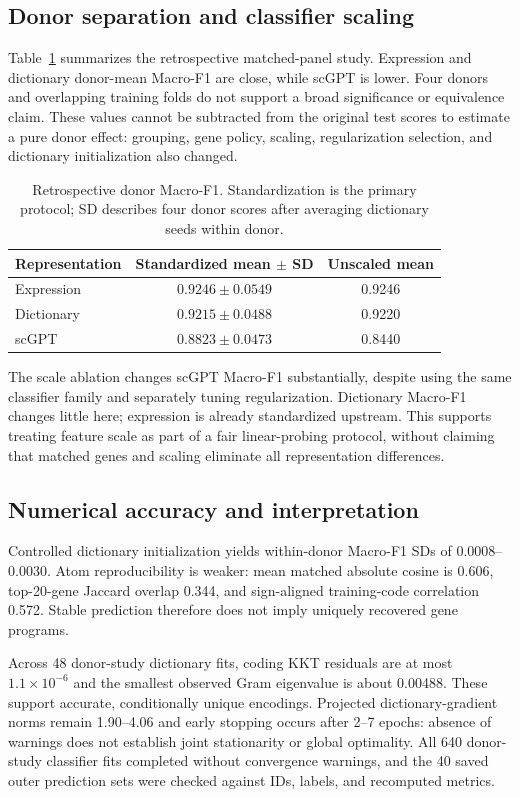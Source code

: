\subsection{Donor separation and classifier scaling}
Table~\ref{tab:donor} summarizes the retrospective matched-panel study.
Expression and dictionary donor-mean Macro-F1 are close, while scGPT is lower.
Four donors and overlapping training folds do not support a broad significance
or equivalence claim. These values cannot be subtracted from the original
test scores to estimate a pure donor effect: grouping, gene policy, scaling,
regularization selection, and dictionary initialization also changed.
\begin{table}[htbp]\centering
\caption{Retrospective donor Macro-F1. Standardization is the primary protocol;
SD describes four donor scores after averaging dictionary seeds within donor.}
\label{tab:donor}
\begin{tabular}{lcc}\toprule
Representation & Standardized mean $\pm$ SD & Unscaled mean\\\midrule
Expression & $0.9246\pm0.0549$ & 0.9246\\
Dictionary & $0.9215\pm0.0488$ & 0.9220\\
scGPT & $0.8823\pm0.0473$ & 0.8440\\\bottomrule
\end{tabular}
\end{table}
The scale ablation changes scGPT Macro-F1 substantially, despite using the
same classifier family and separately tuning regularization. Dictionary
Macro-F1 changes little here; expression is already standardized upstream.
This supports treating feature scale as part of a fair linear-probing
protocol, without claiming that matched genes and scaling eliminate all
representation differences.

\subsection{Numerical accuracy and interpretation}
Controlled dictionary initialization yields within-donor Macro-F1 SDs of
0.0008--0.0030. Atom reproducibility is weaker: mean matched absolute cosine
is 0.606, top-20-gene Jaccard overlap 0.344, and sign-aligned training-code
correlation 0.572. Stable prediction therefore does not imply uniquely
recovered gene programs.

Across 48 donor-study dictionary fits, coding KKT residuals are at most
$1.1\times10^{-6}$ and the smallest observed Gram eigenvalue is about 0.00488.
These support accurate, conditionally unique encodings. Projected
dictionary-gradient norms remain 1.90--4.06 and early stopping occurs after
2--7 epochs: absence of warnings does not establish joint stationarity or
global optimality. All 640 donor-study classifier fits completed without
convergence warnings, and the 40 saved outer prediction sets were checked
against IDs, labels, and recomputed metrics.

